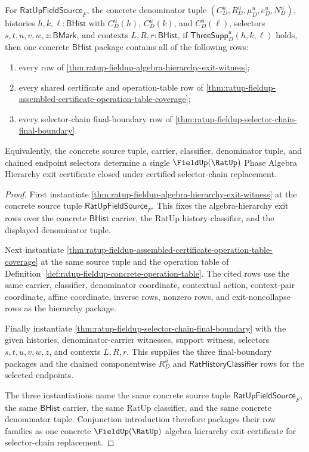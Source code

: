 \begin{theorem}
\label{thm:ratup-fieldup-algebra-hierarchy-selector-chain-exit}
For $\mathsf{RatUpFieldSource}_F$, the concrete denominator tuple
$(C_D^u,R_D^u,\mu_D^u,e_D^u,N_D^u)$, histories
$h,k,\ell:\mathsf{BHist}$ with $C_D^u(h)$, $C_D^u(k)$, and $C_D^u(\ell)$,
selectors $s,t,u,v,w,z:\mathsf{BMark}$, and contexts
$L,R,r:\mathsf{BHist}$, if $\mathsf{ThreeSupp}_D^u(h,k,\ell)$ holds, then one
concrete $\mathsf{BHist}$ package contains all of the following rows:
\begin{enumerate}
  \item every row of
  \autoref{thm:ratup-fieldup-algebra-hierarchy-exit-witness};
  \item every shared certificate and operation-table row of
  \autoref{thm:ratup-fieldup-assembled-certificate-operation-table-coverage};
  \item every selector-chain final-boundary row of
  \autoref{thm:ratup-fieldup-selector-chain-final-boundary}.
\end{enumerate}
Equivalently, the concrete source tuple, carrier, classifier, denominator
tuple, and chained endpoint selectors determine a single
$\FieldUp(\RatUp)$ Phase Algebra Hierarchy exit certificate closed under
certified selector-chain replacement.
\end{theorem}
\begin{proof}
First instantiate
\autoref{thm:ratup-fieldup-algebra-hierarchy-exit-witness} at the concrete
source tuple $\mathsf{RatUpFieldSource}_F$. This fixes the algebra-hierarchy
exit rows over the concrete $\mathsf{BHist}$ carrier, the RatUp history
classifier, and the displayed denominator tuple.

Next instantiate
\autoref{thm:ratup-fieldup-assembled-certificate-operation-table-coverage} at
the same source tuple and the operation table of
Definition~\ref{def:ratup-fieldup-concrete-operation-table}. The cited rows use
the same carrier, classifier, denominator coordinate, contextual action,
context-pair coordinate, affine coordinate, inverse rows, nonzero rows, and
exit-noncollapse rows as the hierarchy package.

Finally instantiate
\autoref{thm:ratup-fieldup-selector-chain-final-boundary} with the given
histories, denominator-carrier witnesses, support witness, selectors
$s,t,u,v,w,z$, and contexts $L,R,r$. This supplies the three final-boundary
packages and the chained componentwise $R_D^u$ and
$\mathsf{RatHistoryClassifier}$ rows for the selected endpoints.

The three instantiations name the same concrete source tuple
$\mathsf{RatUpFieldSource}_F$, the same $\mathsf{BHist}$ carrier, the same RatUp
classifier, and the same concrete denominator tuple. Conjunction introduction
therefore packages their row families as one concrete
$\FieldUp(\RatUp)$ algebra hierarchy exit certificate for selector-chain
replacement.
\end{proof}

